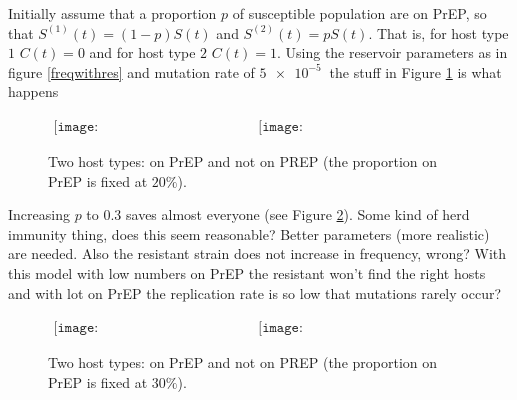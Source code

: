 \documentclass[DIV=15]{scrartcl}
\begin{document}

Initially assume that a proportion $p$ of susceptible population are on PrEP, so that  $S^{(1)}(t) = (1-p)S(t)$ and $S^{(2)}(t) = pS(t)$.  That is, for host type $1$ $C(t) = 0$ and for host type $2$ $C(t) = 1$. Using the reservoir parameters as in figure \ref{freqwithres} and mutation rate of $\SI{5e-5}{}$ the stuff in Figure \ref{20 on prep} is what happens
\begin{figure}[h]
 \begin{center}$
 \begin{array}{cc}
 \texttt{[image: 20ONPrEPFreq\_21\_04a.eps]} &
 \texttt{[image: 20ONPrEPSusInf\_21\_04a.eps]}
 \end{array}$
 \end{center}
 \caption{Two host types: on PrEP and not on PREP (the proportion on PrEP is fixed at $20\%$).}
 \label{20 on prep}
 \end{figure}

Increasing $p$ to $0.3 $ saves almost everyone (see Figure \ref{30 on prep}). Some kind of herd immunity thing, does this seem reasonable? Better parameters (more realistic) are needed. Also the resistant strain does not increase in frequency,  wrong? With this model with low numbers on PrEP the resistant won't find the right hosts and with lot on PrEP the replication rate is so low that mutations rarely occur? 
\begin{figure}[h]
 \begin{center}$
 \begin{array}{cc}
 \texttt{[image: 30ONPrEPFreq\_21\_04a.eps]} &
 \texttt{[image: 30ONPrEPSusInf\_21\_04a.eps]}
 \end{array}$
 \end{center}
 \caption{Two host types: on PrEP and not on PREP (the proportion on PrEP is fixed at $30\%$).}
 \label{30 on prep}
 \end{figure}
\end{document}
